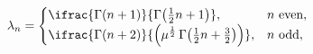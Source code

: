 \[\lambda_{n}=\begin{cases}\ifrac{\mathop{\Gamma\/}\nolimits\!\left(n+1\right)}{%
\mathop{\Gamma\/}\nolimits\!\left(\frac{1}{2}n+1\right)},&n\text{ even},\\
\ifrac{\mathop{\Gamma\/}\nolimits\!\left(n+2\right)}{\left(\mu^{\frac{1}{2}}%
\mathop{\Gamma\/}\nolimits\!\left(\frac{1}{2}n+\frac{3}{2}\right)\right)},&n%
\text{ odd},\end{cases}\]